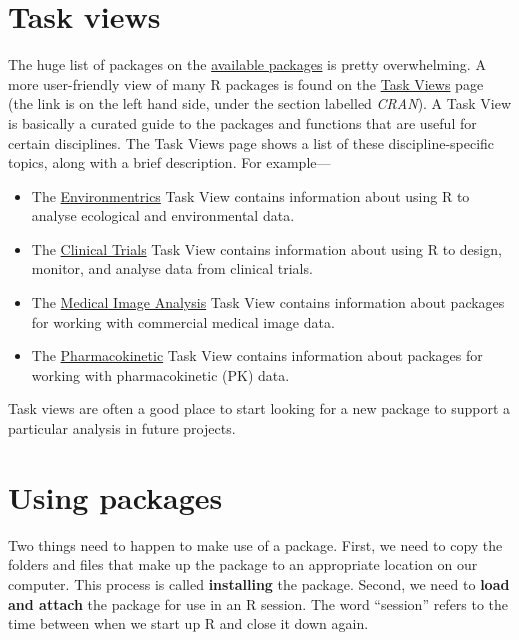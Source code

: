\documentclass[
]{book}
\providecommand{\tightlist}{%
  \setlength{\itemsep}{0pt}\setlength{\parskip}{0pt}}
\begin{document}
\hypertarget{task-views}{%
\section{Task views}\label{task-views}}

The huge list of packages on the \href{http://cran.r-project.org/web/packages/available_packages_by_name.html}{available packages} is pretty overwhelming. A more user-friendly view of many R packages is found on the \href{http://cran.r-project.org/web/views/}{Task Views} page (the link is on the left hand side, under the section labelled \emph{CRAN}). A Task View is basically a curated guide to the packages and functions that are useful for certain disciplines. The Task Views page shows a list of these discipline-specific topics, along with a brief description. For example---

\begin{itemize}
\tightlist
\item
  The \href{http://cran.r-project.org/web/views/Environmetrics.html}{Environmentrics} Task View contains information about using R to analyse ecological and environmental data.
\item
  The \href{https://cran.r-project.org/web/views/ClinicalTrials.html}{Clinical Trials} Task View contains information about using R to design, monitor, and analyse data from clinical trials.
\item
  The \href{https://cran.r-project.org/web/views/MedicalImaging.html}{Medical Image Analysis} Task View contains information about packages for working with commercial medical image data.
\item
  The \href{https://cran.r-project.org/web/views/Pharmacokinetics.html}{Pharmacokinetic} Task View contains information about packages for working with pharmacokinetic (PK) data.
\end{itemize}

Task views are often a good place to start looking for a new package to support a particular analysis in future projects.

\hypertarget{use-packages}{%
\section{Using packages}\label{use-packages}}

Two things need to happen to make use of a package. First, we need to copy the folders and files that make up the package to an appropriate location on our computer. This process is called \textbf{installing} the package. Second, we need to \textbf{load and attach} the package for use in an R session. The word ``session'' refers to the time between when we start up R and close it down again.
\end{document}

